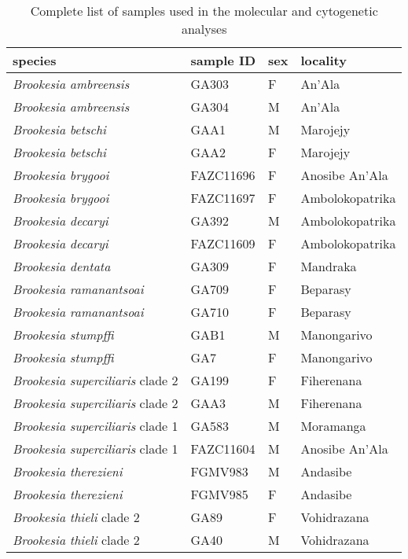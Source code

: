 \begin{longtable}{llll}

\caption{Complete list of samples used in the molecular and cytogenetic analyses}\\ 
  
\hline

\textbf{species} & \textbf{sample ID} & \textbf{sex} & \textbf{locality} \\

\hline

\textit{Brookesia ambreensis} & GA303 & F & An'Ala\\
\textit{Brookesia ambreensis} & GA304 & M & An'Ala\\
\textit{Brookesia betschi} & GAA1 & M & Marojejy\\
\textit{Brookesia betschi} & GAA2 & F & Marojejy\\
\textit{Brookesia brygooi} & FAZC11696 & F & Anosibe An'Ala\\
\textit{Brookesia brygooi} & FAZC11697 & F & Ambolokopatrika\\
\textit{Brookesia decaryi} & GA392 & M & Ambolokopatrika\\
\textit{Brookesia decaryi} & FAZC11609 & F & Ambolokopatrika\\
\textit{Brookesia dentata} & GA309 & F & Mandraka\\
\textit{Brookesia ramanantsoai} & GA709 & F & Beparasy\\
\textit{Brookesia ramanantsoai} & GA710 & F & Beparasy\\
\textit{Brookesia stumpffi} & GAB1 & M & Manongarivo\\
\textit{Brookesia stumpffi} & GA7 & F & Manongarivo\\
\textit{Brookesia superciliaris} clade 2 & GA199 & F & Fiherenana\\
\textit{Brookesia superciliaris} clade 2 & GAA3 & M & Fiherenana\\
\textit{Brookesia superciliaris} clade 1 & GA583 & M & Moramanga\\
\textit{Brookesia superciliaris} clade 1 & FAZC11604 & M & Anosibe An'Ala\\
\textit{Brookesia therezieni} & FGMV983 & M & Andasibe\\
\textit{Brookesia therezieni} & FGMV985 & F & Andasibe\\
\textit{Brookesia thieli} clade 2 & GA89 & F & Vohidrazana\\
\textit{Brookesia thieli} clade 2 & GA40 & M & Vohidrazana\\

\end{longtable}
